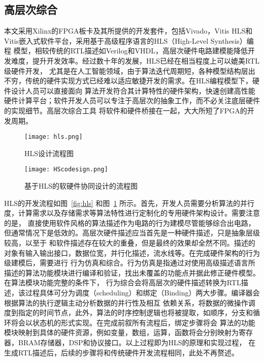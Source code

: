 \subsection{高层次综合}
本文采用Xilinx的FPGA板卡及其所提供的开发套件，包括Vivado，Vitis HLS和Vitis嵌入式软件平台，采用基于高级程序语言的HLS（High-Level Synthesis）编程
模型，相较传统的RTL描述如Verilog和VHDL，高层次硬件电路建模能降低开发难度，提升开发效率。经过数十年的发展，HLS已经在相当程度上可以媲美RTL级硬件开发，
尤其是在人工智能领域，由于算法迭代周期短，各种模型结构层出不穷，传统的硬件实现方式已经难以适应敏捷开发的需求。在HLS编程模型下，硬件设计人员可以直接面向
算法开发符合其计算特性的硬件架构，快速创建高性能硬件计算平台；软件开发人员可以专注于高层次的抽象工作，而不必关注底层硬件的实现细节。高层次综合工具
将软件和硬件桥接在一起，大大所短了FPGA的开发周期。
\begin{figure}
	\centering
	\begin{minipage}[t]{0.48\textwidth}
		\centering
		\texttt{[image: hls.png]}
		\caption{HLS设计流程图}
		\label{fig:hls}
	\end{minipage}
	\begin{minipage}[t]{0.48\textwidth}
		\centering
		\texttt{[image: HScodesign.png]}
		\caption{基于HLS的软硬件协同设计的流程图}
		\label{fig:hlscodesign}
	\end{minipage}
\end{figure}

HLS的开发流程如图~\ref{fig:hls} 和图~\ref{fig:hlscodesign} 所示。首先，开发人员需要分析算法的并行度，计算需求以及存储需求等算法特性进行定制化的专用硬件架构设计。需要注意的是，
直接使用软件风格的算法描述作为电路的行为建模尽管能够综合出电路，但通常情况下是低效的。高层次硬件描述应当首先是一种硬件描述，只是抽象层级较高，以至于
和软件描述存在较大的重叠，但是最终的效果却全然不同。描述的对象有输入输出接口，数据位宽，并行化描述，流水线等。在完成硬件架构的行为级建模后，需要进行
行为仿真和综合。行为仿真是指通过对使用高级描述语言所描述的算法功能模块进行编译和验证，找出未覆盖的功能点并据此修正硬件模型。在算法模块功能完整的条件下，
行为综合会将高层次的硬件描述转换为RTL描述，该过程具体可分为调度（scheduling）和绑定（Binding）两大步骤。编译器会根据算法的执行逻辑主动分析数据的并行性及相互
依赖关系，将数据的微操作调度到指定的时间节点，此外，算法的时序控制逻辑也将被提取，如顺序，分支和循环将会以状态机的形式实现。在完成前叙所有流程后，绑定步骤将会
算法的功能模块映射到具体的硬件资源，例如变量，数组，运算，函数将会分别映射为寄存器，BRAM存储器，DSP和协议接口。以上过程即为HLS的原理和实现过程，
在生成RTL描述后，后续的步骤将和传统硬件开发流程相同，此处不再赘述。

